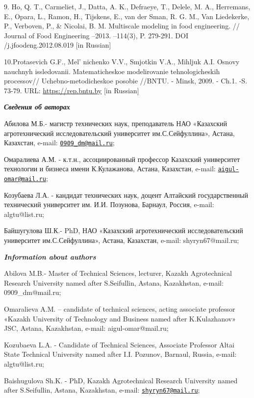 \begin{references}
9. Ho, Q. T., Carmeliet, J., Datta, A. K., Defraeye, T., Delele, M. A.,
Herremans, E., Opara, L., Ramon, H., Tijskens, E., van der Sman, R. G.
M., Van Liedekerke, P., Verboven, P., \& Nicolai, B. M. Multiscale
modeling in food engineering. // Journal of Food Engineering --2013.
--114(3), P. 279-291. DOI /j.jfoodeng.2012.08.019 {[}in
Russian{]}

10.Protasevich G.F., Mel' nichenko V.V., Smjotkin V.A.,
Mihljuk A.I. Osnovy nauchnyh issledovanii. Matematicheskoe modelirovanie
tehnologicheskih processov// Uchebno-metodicheskoe posobie //BNTU. -
Minsk, 2009. - Ch.1. -S. 73-79. URL: \href{https://rep.bntu.by/handle/data/5233}{https://rep.bntu.by} {[}in Russian{]}
\end{references}

\begin{authorinfo}
\hspace{1em}\emph{{\bfseries Сведения об авторах}}

Абилова М.Б.- магистр технических наук, преподаватель НАО «Казахский
агротехнический исследовательский университет им.С.Сейфуллина», Астана,
Казахстан, e-mail:
\href{mailto:0909_dm@mail.ru}{\nolinkurl{0909\_dm@mail.ru}};

Омаралиева А.М. - к.т.н., ассоциированный профессор Казахский
университет технологии и бизнеса имени К.Кулажанова, Астана, Казахстан,
e-mail:
\href{mailto:aigul-omar@mail.ru}{\nolinkurl{aigul-omar@mail.ru}};

Козубаева Л.А. - кандидат технических наук, доцент Алтайский
государственный технический университет им. \linebreak  И.И. Позунова, Барнаул,
Россия, e-mail: algtu@list.ru;

Байшугулова Ш.К.- PhD, НАО «Казахский агротехнический исследовательский
университет им.С.Сейфуллина», Астана, Казахстан, e-mail:
shyryn67@mail.ru;

\hspace{1em}\emph{{\bfseries Information about authors}}

Abilova M.B.- Master of Technical Sciences, lecturer, Kazakh
Agrotechnical Research University named after S.Seifullin, Astana,
Kazakhstan, e-mail: 0909\_dm@mail.ru;

Omaralieva A.M. -- candidate of technical sciences, acting associate
professor «Kazakh University of Technology and Business named after
K.Kulazhanov» JSC, Astana, Kazakhstan, e-mail: aigul-omar@mail.ru;

Kozubaeva L.A. - Candidate of Technical Sciences, Associate Professor
Altai State Technical University named after \linebreak  I.I. Pozunov, Barnaul,
Russia, e-mail: algtu@list.ru;

Baishugulova Sh.K. - PhD, Kazakh Agrotechnical Research University named
after S.Seifullin, Astana, Kazakhstan, e-mail:
\href{mailto:shyryn67@mail.ru}{\nolinkurl{shyryn67@mail.ru}};
\end{authorinfo}
